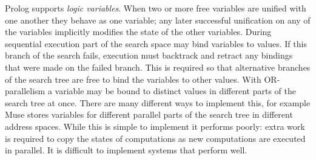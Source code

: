 
Prolog supports \emph{logic variables}.
When two or more free variables are unified with one another they behave as one
variable;
any later successful unification on any of the variables implicitly modifies
the state of the other variables.
During sequential execution
part of the search space may bind variables to values.
If this branch of the search fails,
execution must backtrack and retract any bindings that were made on the
failed branch.
This is required so that alternative
branches of the search tree are free to bind the variables to other values.
With OR-parallelism a variable may be bound to distinct values in different
parts of the search tree at once.
There are many different ways to implement this,
for example Muse stores variables for different parallel parts of the search
tree in different address spaces.
While this is simple to implement it performs poorly:
extra work is required to copy the states of computations as new
computations are executed in parallel.
It is difficult to implement systems that perform well.

